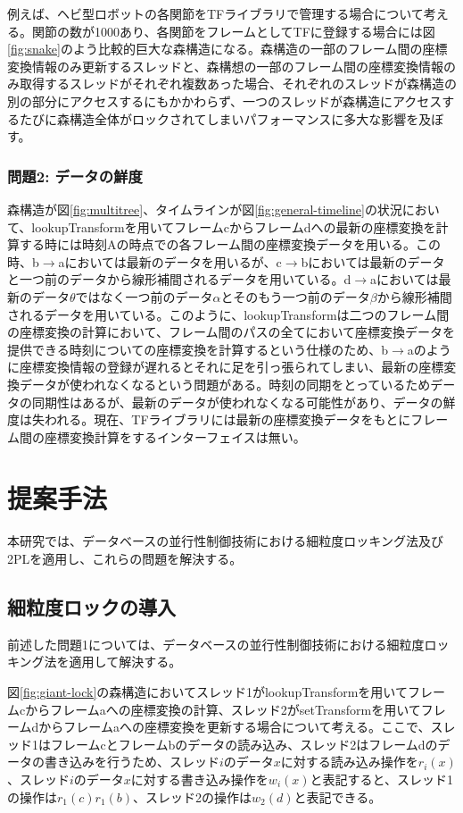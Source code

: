 \documentclass[a4paper]{jreport}	%
\begin{document}
例えば、ヘビ型ロボットの各関節をTFライブラリで管理する場合について考える。関節の数が1000あり、各関節をフレームとしてTFに登録する場合には図\ref{fig:snake}のよう比較的巨大な森構造になる。森構造の一部のフレーム間の座標変換情報のみ更新するスレッドと、森構想の一部のフレーム間の座標変換情報のみ取得するスレッドがそれぞれ複数あった場合、それぞれのスレッドが森構造の別の部分にアクセスするにもかかわらず、一つのスレッドが森構造にアクセスするたびに森構造全体がロックされてしまいパフォーマンスに多大な影響を及ぼす。

\subsection*{問題2: データの鮮度}
森構造が図\ref{fig:multitree}、タイムラインが図\ref{fig:general-timeline}の状況において、lookupTransformを用いてフレームcからフレームdへの最新の座標変換を計算する時には時刻Aの時点での各フレーム間の座標変換データを用いる。この時、b$\rightarrow$aにおいては最新のデータを用いるが、c$\rightarrow$bにおいては最新のデータと一つ前のデータから線形補間されるデータを用いている。d$\rightarrow$aにおいては最新のデータ$\theta$ではなく一つ前のデータ$\alpha$とそのもう一つ前のデータ$\beta$から線形補間されるデータを用いている。このように、lookupTransformは二つのフレーム間の座標変換の計算において、フレーム間のパスの全てにおいて座標変換データを提供できる時刻についての座標変換を計算するという仕様のため、b$\rightarrow$aのように座標変換情報の登録が遅れるとそれに足を引っ張られてしまい、最新の座標変換データが使われなくなるという問題がある。時刻の同期をとっているためデータの同期性はあるが、最新のデータが使われなくなる可能性があり、データの鮮度は失われる。現在、TFライブラリには最新の座標変換データをもとにフレーム間の座標変換計算をするインターフェイスは無い。

\chapter{提案手法}
本研究では、データベースの並行性制御技術における細粒度ロッキング法及び2PLを適用し、これらの問題を解決する。

\section{細粒度ロックの導入}
\label{section:intro-high-gran-lock}

前述した問題1については、データベースの並行性制御技術における細粒度ロッキング法を適用して解決する。

図\ref{fig:giant-lock}の森構造においてスレッド1がlookupTransformを用いてフレームcからフレームaへの座標変換の計算、スレッド2がsetTransformを用いてフレームdからフレームaへの座標変換を更新する場合について考える。ここで、スレッド1はフレームcとフレームbのデータの読み込み、スレッド2はフレームdのデータの書き込みを行うため、スレッド$i$のデータ$x$に対する読み込み操作を$r_i(x)$、スレッド$i$のデータ$x$に対する書き込み操作を$w_i(x)$と表記すると、スレッド1の操作は$r_1(c)r_1(b)$、スレッド2の操作は$w_2(d)$と表記できる。
\end{document}
